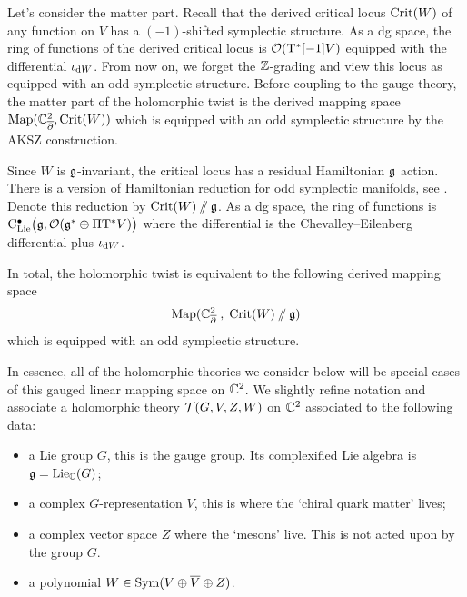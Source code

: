\documentclass[11pt]{amsart}
\begin{document}
Let's consider the matter part. 
Recall that the derived critical locus ${\rm Crit}(W)$ of any function on $V$ has a $(-1)$-shifted symplectic structure. 
As a dg space, the ring of functions of the derived critical locus is $\cO(\T^* [-1] V)$ equipped with the differential $\iota_{\d W}$. 
From now on, we forget the $\ZZ$-grading and view this locus as equipped with an odd symplectic structure. 
Before coupling to the gauge theory, the matter part of the holomorphic twist is the derived mapping space ${\rm Map}(\CC^2_{\dbar}, {\rm Crit}(W))$ which is equipped with an odd symplectic structure by the AKSZ construction. 

Since $W$ is $\fg$-invariant, the critical locus has a residual Hamiltonian $\fg$ action. 
There is a version of Hamiltonian reduction for odd symplectic manifolds, see \cite{Pavel, Kevin, who else}. 
Denote this reduction by ${\rm Crit}(W) \sslash \fg$. 
As a dg space, the ring of functions is $\clie^\bu\big(\fg , \cO(\fg^* \oplus \Pi \T^* V) \big)$ where the differential is the Chevalley--Eilenberg differential plus $\iota_{\d W}$. 

In total, the holomorphic twist is equivalent to the following derived mapping space
\[
{\rm Map}(\CC^2_{\dbar} \; , \; {\rm Crit}(W) \sslash \fg) 
\]
which is equipped with an odd symplectic structure. 

In essence, all of the holomorphic theories we consider below will be special cases of this gauged linear mapping space on $\CC^2$. 
We slightly refine notation and associate a holomorphic theory $\cT(G, V, Z, W)$ on $\CC^2$ associated to the following data:
\begin{itemize}
\item a Lie group $G$, this is the gauge group. 
Its complexified Lie algebra is $\fg = {\rm Lie}_\CC (G)$;
\item a complex $G$-representation $V$, this is where the `chiral quark matter' lives;
\item a complex vector space $Z$ where the `mesons' live.
This is not acted upon by the group $G$. 
\item a polynomial $W \in {\rm Sym}(V \oplus \Bar{V} \oplus Z)$.
\end{itemize}
\end{document}

